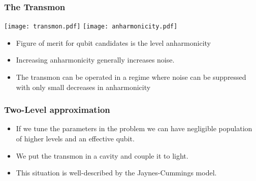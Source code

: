 \documentclass{beamer}
\begin{document}
\begin{frame}

    \frametitle{The Transmon}

    \texttt{[image: transmon.pdf]}
    \texttt{[image: anharmonicity.pdf]}

    \begin{itemize}
        \item Figure of merit for qubit candidates is the level anharmonicity 
        \item Increasing anharmonicity generally increases noise.
        \item The transmon can be operated in a regime where noise can be suppressed with only small decreases in anharmonicity  
    \end{itemize}

\end{frame}
\begin{frame}

    \frametitle{Two-Level approximation}

    \begin{itemize}
        \item If we tune the parameters in the problem we can have negligible population of higher levels and an effective qubit.
        \item We put the transmon in a cavity and couple it to light.
        \item This situation is well-described by the Jaynes-Cummings model.
    \end{itemize}

\end{frame}
\end{document}
